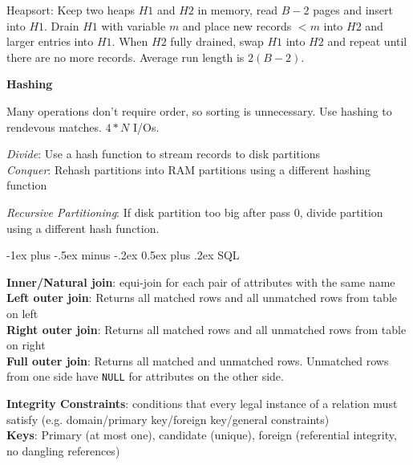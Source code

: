 \documentclass[10pt,landscape]{article}
\makeatletter
\renewcommand{\section}{\@startsection{section}{1}{0mm}%
                                {-1ex plus -.5ex minus -.2ex}%
                                {0.5ex plus .2ex}%
                                {\normalfont\large\bfseries}}
\makeatother
\begin{document}
\begin{multicols}{3}
Heapsort: Keep two heaps $H1$ and $H2$ in memory, read $B-2$ pages and insert into $H1$. Drain $H1$ with variable $m$ and place new records $<m$ into $H2$ and larger entries into $H1$. When $H2$ fully drained, swap $H1$ into $H2$ and repeat until there are no more records. Average run length is $2(B-2)$.

\textbf{Hashing}

Many operations don't require order, so sorting is unnecessary. Use hashing to rendevous matches. $4*N$ I/Os.

\textit{Divide}: Use a hash function to stream records to disk partitions \\
\textit{Conquer}: Rehash partitions into RAM partitions using a different hashing function

\textit{Recursive Partitioning}: If disk partition too big after pass 0, divide partition using a different hash function.


\section{SQL}

%
%

\textbf{Inner/Natural join}: equi-join for each pair of attributes with the same name \\
\textbf{Left outer join}: Returns all matched rows and all unmatched rows from table on left \\
\textbf{Right outer join}: Returns all matched rows and all unmatched rows from table on right \\
\textbf{Full outer join}: Returns all matched and unmatched rows. Unmatched rows from one side have \texttt{NULL} for attributes on the other side.

\textbf{Integrity Constraints}: conditions that every legal instance of a relation must satisfy (e.g. domain/primary key/foreign key/general constraints) \\
\textbf{Keys}: Primary (at most one), candidate (unique), foreign (referential integrity, no dangling references)


\end{multicols}
\end{document}
